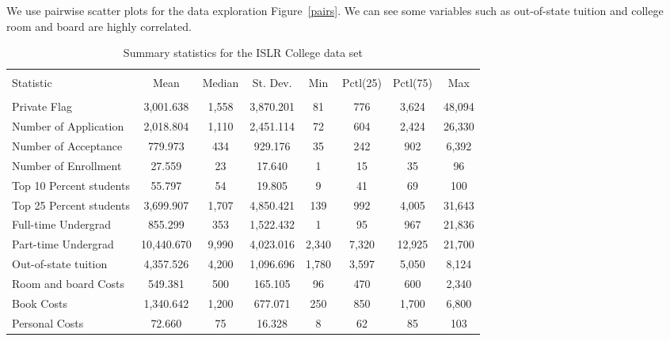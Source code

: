 \documentclass{article}\usepackage[]{graphicx}\usepackage[]{color}
\begin{document}
We use pairwise scatter plots for the data exploration Figure~\ref{pairs}. We can see some variables such as out-of-state tuition and college room and board are highly correlated.



\begin{table} \centering 
  \caption{Summary statistics for the ISLR College data set} 
  \label{descrips} 
\begin{tabular}{@{\extracolsep{5pt}}lccccccc} 
\\[-1.8ex]\hline 
\hline \\[-1.8ex] 
Statistic & \multicolumn{1}{c}{Mean} & \multicolumn{1}{c}{Median} & \multicolumn{1}{c}{St. Dev.} & \multicolumn{1}{c}{Min} & \multicolumn{1}{c}{Pctl(25)} & \multicolumn{1}{c}{Pctl(75)} & \multicolumn{1}{c}{Max} \\ 
\hline \\[-1.8ex] 
Private Flag & 3,001.638 & 1,558 & 3,870.201 & 81 & 776 & 3,624 & 48,094 \\ 
Number of Application & 2,018.804 & 1,110 & 2,451.114 & 72 & 604 & 2,424 & 26,330 \\ 
Number of Acceptance & 779.973 & 434 & 929.176 & 35 & 242 & 902 & 6,392 \\ 
Number of Enrollment & 27.559 & 23 & 17.640 & 1 & 15 & 35 & 96 \\ 
Top 10 Percent students & 55.797 & 54 & 19.805 & 9 & 41 & 69 & 100 \\ 
Top 25 Percent students & 3,699.907 & 1,707 & 4,850.421 & 139 & 992 & 4,005 & 31,643 \\ 
Full-time Undergrad & 855.299 & 353 & 1,522.432 & 1 & 95 & 967 & 21,836 \\ 
Part-time Undergrad & 10,440.670 & 9,990 & 4,023.016 & 2,340 & 7,320 & 12,925 & 21,700 \\ 
Out-of-state tuition & 4,357.526 & 4,200 & 1,096.696 & 1,780 & 3,597 & 5,050 & 8,124 \\ 
Room and board Costs & 549.381 & 500 & 165.105 & 96 & 470 & 600 & 2,340 \\ 
Book Costs & 1,340.642 & 1,200 & 677.071 & 250 & 850 & 1,700 & 6,800 \\ 
Personal Costs & 72.660 & 75 & 16.328 & 8 & 62 & 85 & 103 \\ 

\end{tabular}
\end{table}
\end{document}
